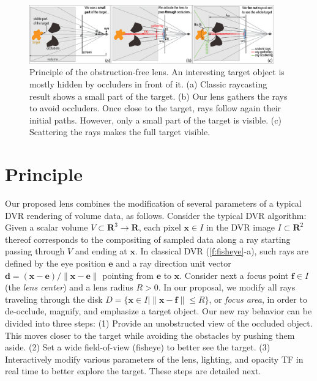 \begin{figure}[htbp]
\centering
\vspace{-0.15cm}
\includegraphics [width=0.94\textwidth]{images/principle.eps}
\vspace{-0.15cm}
\caption{Principle of the obstruction-free lens. An interesting target object is mostly hidden by occluders in front of it. (a) Classic raycasting result shows a small part of the target. (b) Our lens gathers the rays to avoid occluders. Once close to the target, rays follow again their initial paths. However, only a small part of the target is visible. (c) Scattering the rays makes the full target visible.}
\label{f:fisheye}
\vspace{-0.15cm}
\end{figure}

\vspace{-0.15cm}
\section{Principle}
\label{sec:principle}
%
%
Our proposed lens combines the modification of several parameters of a typical DVR rendering of volume data, as follows. Consider the typical DVR algorithm: Given a scalar volume $V \subset \mathbf{R}^3 \rightarrow \mathbf{R}$, each pixel $\mathbf{x} \in I$ in the DVR image $I \subset \mathbf{R}^2$ thereof corresponds to the compositing of sampled data along a ray starting passing through $V$ and ending at $\mathbf{x}$. In classical DVR (\autoref{f:fisheye}-a), such rays are defined by the eye position $\mathbf{e}$ and a ray direction unit vector $\mathbf{d} = (\mathbf{x} - \mathbf{e}) / \| \mathbf{x} - \mathbf{e} \|$ pointing from $\mathbf{e}$ to $\mathbf{x}$. Consider next a focus point $\mathbf{f} \in I$ (the \emph{lens center}) and a lens radius $R > 0$. In our proposal, we modify all rays traveling through the disk $D = \{\mathbf{x} \in I | \| \mathbf{x} - \mathbf{f} \| \leq R\}$, or \emph{focus area}, in order to de-occlude, magnify, and emphasize a target object. Our new ray behavior can be divided into three steps: (1) Provide an unobstructed view of the occluded object. This moves closer to the target while avoiding the obstacles by pushing them aside. (2) Set a wide field-of-view (fisheye) to better see the target. (3) Interactively modify various parameters of the lens, lighting, and opacity TF in real time to better explore the target. These steps are detailed next.

